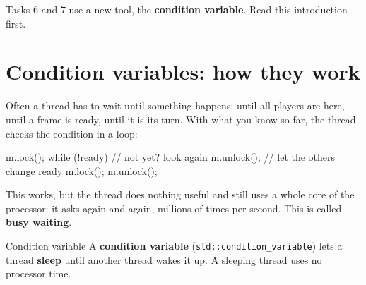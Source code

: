 
Tasks 6 and 7 use a new tool, the \textbf{condition variable}. Read this introduction first.

\section{Condition variables: how they work}

Often a thread has to wait until something happens: until all players are here, until a frame is ready,
until it is its turn. With what you know so far, the thread checks the condition in a loop:

\begin{code}
m.lock();
while (!ready) {      // not yet? look again
    m.unlock();       // let the others change ready
    m.lock();
}
m.unlock();
\end{code}

This works, but the thread does nothing useful and still uses a whole core of the processor: it asks
again and again, millions of times per second. This is called \textbf{busy waiting}.

\begin{definition}{Condition variable}
A \textbf{condition variable} (\texttt{std::condition\_variable}) lets a thread \textbf{sleep} until another thread
wakes it up. A sleeping thread uses no processor time.
\end{definition}

\begin{center}
\end{center}


